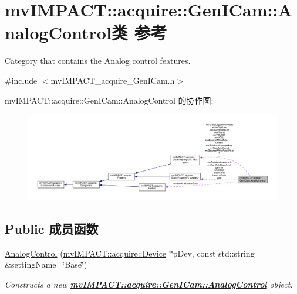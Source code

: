 \hypertarget{classmv_i_m_p_a_c_t_1_1acquire_1_1_gen_i_cam_1_1_analog_control}{\section{mv\+I\+M\+P\+A\+C\+T\+:\+:acquire\+:\+:Gen\+I\+Cam\+:\+:Analog\+Control类 参考}
\label{classmv_i_m_p_a_c_t_1_1acquire_1_1_gen_i_cam_1_1_analog_control}
}


Category that contains the Analog control features.  




{\ttfamily \#include $<$mv\+I\+M\+P\+A\+C\+T\+\_\+acquire\+\_\+\+Gen\+I\+Cam.\+h$>$}



mv\+I\+M\+P\+A\+C\+T\+:\+:acquire\+:\+:Gen\+I\+Cam\+:\+:Analog\+Control 的协作图\+:
\nopagebreak
\begin{figure}[H]
\begin{center}
\leavevmode
\includegraphics[width=350pt]{classmv_i_m_p_a_c_t_1_1acquire_1_1_gen_i_cam_1_1_analog_control__coll__graph}
\end{center}
\end{figure}
\subsection*{Public 成员函数}
\begin{DoxyCompactItemize}
\item 
\hyperlink{classmv_i_m_p_a_c_t_1_1acquire_1_1_gen_i_cam_1_1_analog_control_a88bf85ca3c41e27b68c3af8eb12ee605}{Analog\+Control} (\hyperlink{classmv_i_m_p_a_c_t_1_1acquire_1_1_device}{mv\+I\+M\+P\+A\+C\+T\+::acquire\+::\+Device} $\ast$p\+Dev, const std\+::string \&setting\+Name=\char`\"{}Base\char`\"{})
\begin{DoxyCompactList}\small\item\em Constructs a new {\bfseries \hyperlink{classmv_i_m_p_a_c_t_1_1acquire_1_1_gen_i_cam_1_1_analog_control}{mv\+I\+M\+P\+A\+C\+T\+::acquire\+::\+Gen\+I\+Cam\+::\+Analog\+Control}} object. \end{DoxyCompactList}\end{DoxyCompactItemize}
